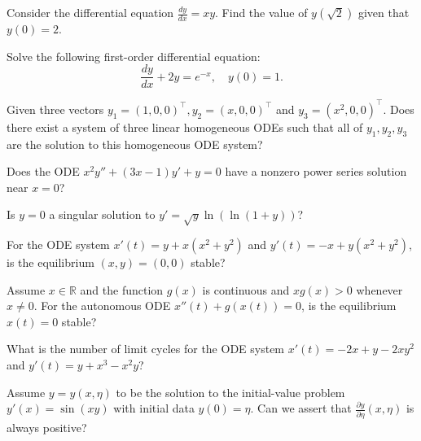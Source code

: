 \newpage







\begin{problem} Consider the differential equation $\frac{dy}{dx} = xy$. Find the value of $y(\sqrt{2})$ given that $y(0) = 2$.
\end{problem}

\begin{problem} Solve the following first-order differential equation:
\begin{equation*}
    \frac{dy}{dx} + 2y = e^{-x}, \quad y(0) = 1.
\end{equation*}
\end{problem}

\begin{problem} Given three vectors $y_1=(1,0,0)^\top,y_2=(x,0,0)^\top$ and $y_3=(x^2,0,0)^\top$. Does there exist a system of three linear homogeneous ODEs such that all of $y_1,y_2,y_3$ are the solution to this homogeneous ODE system?
\end{problem}

\begin{problem} Does the ODE $x^2y''+(3x-1)y'+y=0$ have a nonzero power series solution near $x=0$? 
\end{problem}

\begin{problem} Is $y=0$ a singular solution to $y'=\sqrt{y}\ln(\ln(1+y))$?
\end{problem}

\begin{problem} For the ODE system $x'(t)=y+x(x^2+y^2)$ and $y'(t)=-x+y(x^2+y^2)$, is the equilibrium $(x,y)=(0,0)$ stable?
\end{problem}

\begin{problem} Assume $x\in\mathbb{R}$ and the function $g(x)$ is continuous and $xg(x)>0$ whenever $x\neq 0$. For the autonomous ODE $x''(t)+g(x(t))=0$, is the equilibrium $x(t)=0$ stable?
\end{problem}

\begin{problem} What is the number of limit cycles for the ODE system $x'(t)=-2x+y-2xy^2$ and $y'(t)=y+x^3-x^2y$? 
\end{problem}

\begin{problem} Assume $y=y(x,\eta)$ to be the solution to the initial-value problem $y'(x)=\sin(xy)$ with initial data $y(0)=\eta$. Can we assert that $\frac{\partial y}{\partial \eta}(x,\eta)$ is always positive? 
\end{problem}

